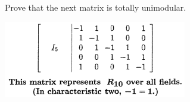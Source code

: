 \prob
{
    Prove that the next matrix is totally unimodular.
    \begin{center}
        \includegraphics[width=8cm]{Test3/Problem2/R10.png}
    \end{center}\pn
}
